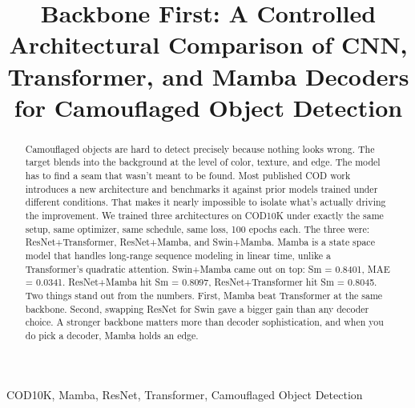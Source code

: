 \documentclass[10pt,conference]{IEEEtran}
\begin{document}
   \makeatletter
    \newcommand{\linebreakand}{%
      \end{@IEEEauthorhalign}
      \hfill\mbox{}\par
      \mbox{}\hfill\begin{@IEEEauthorhalign}
    }
    \makeatother

\title{Backbone First: A Controlled Architectural Comparison of CNN, Transformer, and Mamba Decoders for Camouflaged Object Detection}

\author{

}

\maketitle

\begin{abstract}
Camouflaged objects are hard to detect precisely because nothing looks wrong. The target blends into the background at the level of color, texture, and edge. The model has to find a seam that wasn't meant to be found. Most published COD work introduces a new architecture and benchmarks it against prior models trained under different conditions. That makes it nearly impossible to isolate what's actually driving the improvement. We trained three architectures on COD10K under exactly the same setup, same optimizer, same schedule, same loss, 100 epochs each. The three were: ResNet+Transformer, ResNet+Mamba, and Swin+Mamba. Mamba is a state space model that handles long-range sequence modeling in linear time, unlike a Transformer's quadratic attention. Swin+Mamba came out on top: Sm = 0.8401, MAE = 0.0341. ResNet+Mamba hit Sm = 0.8097, ResNet+Transformer hit Sm = 0.8045. Two things stand out from the numbers. First, Mamba beat Transformer at the same backbone. Second, swapping ResNet for Swin gave a bigger gain than any decoder choice. A stronger backbone matters more than decoder sophistication, and when you do pick a decoder, Mamba holds an edge.
\end{abstract}

\begin{IEEEkeywords}
COD10K, Mamba, ResNet, Transformer, Camouflaged Object Detection
\end{IEEEkeywords}
\end{document}
